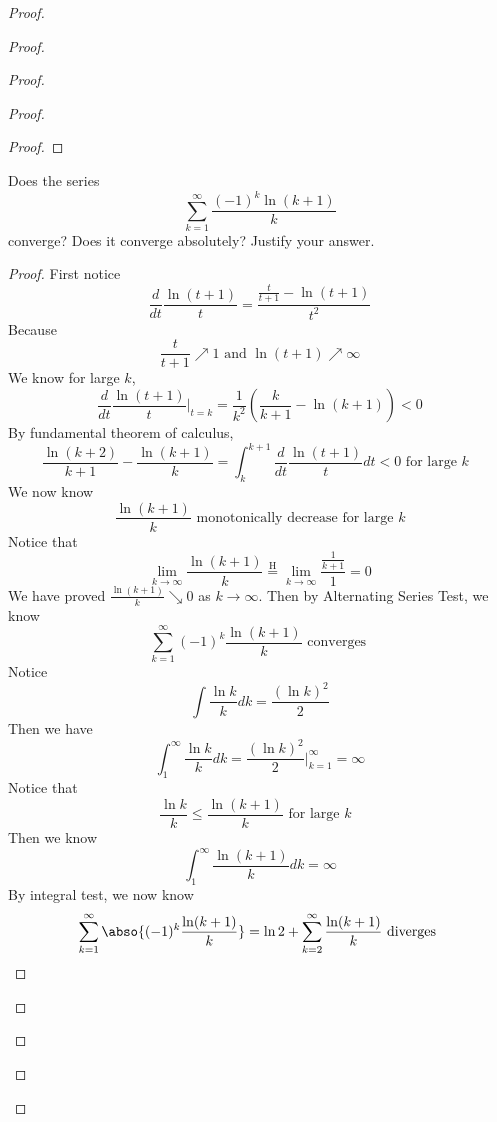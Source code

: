 \documentclass{report}
\begin{document}
\begin{proof}
\begin{proof}
\begin{proof}
\begin{proof}
\begin{proof}
\end{proof}

\begin{question}{}{}
Does the series
\[
\sum_{k=1}^{\infty} \frac{(-1)^k \ln(k + 1)}{k}
\]
converge? Does it converge absolutely? Justify your answer.
\end{question}
\begin{proof}
First notice
\begin{equation*}
\frac{d}{dt}\frac{\ln (t+1)}{t} =\frac{\frac{t}{t+1}- \ln (t+1)}{t^2}
\end{equation*}
Because 
\begin{equation*}
\frac{t}{t+1}\nearrow 1 \text{ and }\ln (t+1)\nearrow \infty
\end{equation*}
We know for large $k$, 
\begin{equation*}
\frac{d}{dt}\frac{\ln (t+1)}{t} \bigg|_{t=k} =\frac{1}{k^2}(\frac{k}{k+1}-\ln (k+1))<0
\end{equation*}
By fundamental theorem of calculus, 
\begin{equation*}
\frac{\ln (k+2)}{k+1}-\frac{\ln (k+1)}{k}=\int_{k}^{k+1} \frac{d}{dt} \frac{\ln (t+1)}{t}dt<0\text{ for large $k$ }
\end{equation*}
We now know 
\begin{equation*}
\frac{\ln (k+1)}{k}\text{ monotonically decrease for large $k$}
\end{equation*}
Notice that 
\begin{equation*}
\lim_{k\to\infty} \frac{\ln (k+1)}{k}\stackrel{\mathrm{H}}{=}\lim_{k\to\infty} \frac{\frac{1}{k+1}}{1}=0
\end{equation*}
We have proved $\frac{\ln (k+1)}{k}\searrow 0$ as $k\to\infty$. Then by Alternating Series Test, we know 
\begin{equation*}
\sum_{k=1}^\infty (-1)^k \frac{\ln (k+1)}{k}\text{ converges }
\end{equation*}
Notice 
\begin{equation*}
\int \frac{\ln k}{k}dk=\frac{(\ln k)^2}{2}
\end{equation*}
Then we have
\begin{equation*}
\int_{1}^\infty \frac{\ln k}{k}dk= \frac{(\ln k)^2}{2}\bigg|_{k=1}^\infty =\infty 
\end{equation*}
Notice that 
\begin{equation*}
\frac{\ln k}{k}\leq \frac{\ln (k+1)}{k}\text{ for large $k$ }
\end{equation*}
Then we know
\begin{equation*}
\int_1^\infty \frac{\ln (k+1)}{k}dk =\infty
\end{equation*}
By integral test, we now know 
\begin{equation*}
\sum_{k=1}^\infty \abso{(-1)^k \frac{\ln (k+1)}{k}}=\ln 2+\sum_{k=2}^\infty \frac{\ln (k+1)}{k}\text{ diverges }
\end{equation*}



\end{proof}
\end{proof}
\end{proof}
\end{proof}
\end{proof}
\end{document}
